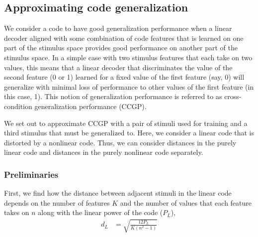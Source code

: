 \documentclass[letter,12pt]{article}
\begin{document}
\subsection{Approximating code generalization}
We consider a code to have good generalization performance when a linear decoder
aligned with some combination of code features that is learned on one part of the
stimulus space provides good performance on another part of the stimulus space.
In a simple case with two stimulus features that each take on two values, this
means that a linear decoder that discriminates the value of the second feature
(0 or 1) learned for a fixed value of the first feature (say, 0) will generalize
with minimal loss of performance to other values of the first feature (in this
case, 1). This notion of generalization performance is referred to as
cross-condition generalization performance (CCGP).

We set out to approximate CCGP with a pair of stimuli used for training and
a third stimulus that must be generalized to. Here, we consider a linear code
that is distorted by a nonlinear code.
Thus, we can consider distances in the purely linear code and distances in the
purely nonlinear code separately.

\subsubsection{Preliminaries}
First, we find how the distance between
adjacent stimuli in the linear code depends on the number of features $K$ and
the number of values that each feature takes on $n$ along with the linear power
of the code ($P_{L}$),
\begin{align}
d_{L} &= \sqrt{\frac{12 P_{L}}{K (n^2 - 1)}}
\end{align}
\end{document}
